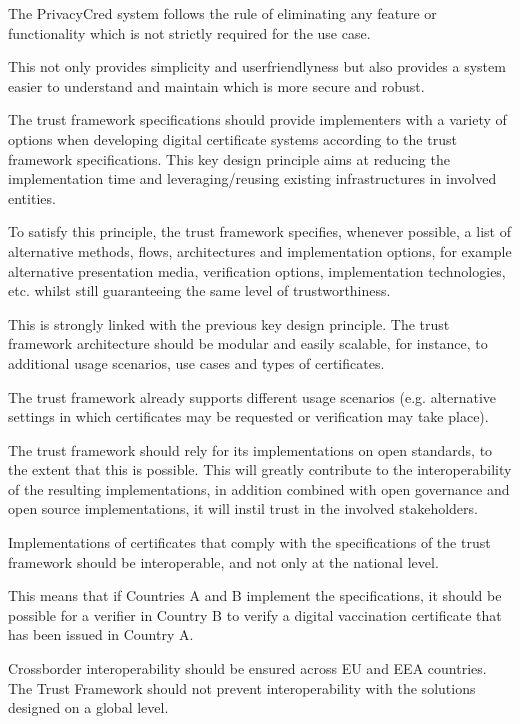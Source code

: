 \documentclass[a4paper,12pt,english,openany]{sphinxmanual}
\begin{document}
\begin{description}
\sphinxAtStartPar
The PrivacyCred system follows the rule of  eliminating any feature or functionality which is not strictly required for the use case.

\sphinxAtStartPar
This not only provides simplicity and user\sphinxhyphen{}friendlyness but also provides a system easier to understand and maintain which is more secure and robust.

\item[{Implementation flexibility}] \leavevmode
\sphinxAtStartPar
The trust framework specifications should provide implementers with a variety of options when developing digital certificate systems according to the trust framework specifications. This key design principle aims at reducing the implementation time and leveraging/reusing existing infrastructures in involved entities.

\sphinxAtStartPar
To satisfy this principle, the trust framework specifies, whenever possible, a list of alternative methods, flows, architectures and implementation options, for example alternative presentation media, verification options, implementation technologies, etc. whilst still guaranteeing the same level of trustworthiness.

\item[{Modularity and scalability}] \leavevmode
\sphinxAtStartPar
This is strongly linked with the previous key design principle. The trust framework architecture should be modular and easily scalable, for instance, to additional usage scenarios, use cases and types of certificates.

\sphinxAtStartPar
The trust framework already supports different usage scenarios (e.g. alternative settings in which certificates may be requested or verification may take place).

\item[{Open standards}] \leavevmode
\sphinxAtStartPar
The trust framework should rely for its implementations on open standards, to the extent that this is possible. This will greatly contribute to the interoperability of the resulting implementations, in addition combined with open governance and open source implementations, it will instil trust in the involved stakeholders.

\item[{Cross\sphinxhyphen{}border interoperability}] \leavevmode
\sphinxAtStartPar
Implementations of certificates that comply with the specifications of the trust framework should be interoperable, and not only at the national level.

\sphinxAtStartPar
This means that if Countries A and B implement the specifications, it should be possible for a verifier in Country B to verify a digital vaccination certificate that has been issued in Country A.

\sphinxAtStartPar
Cross\sphinxhyphen{}border interoperability should be ensured across EU and EEA countries. The Trust Framework should not prevent interoperability with the solutions designed on a global level.

\end{description}
\end{document}
